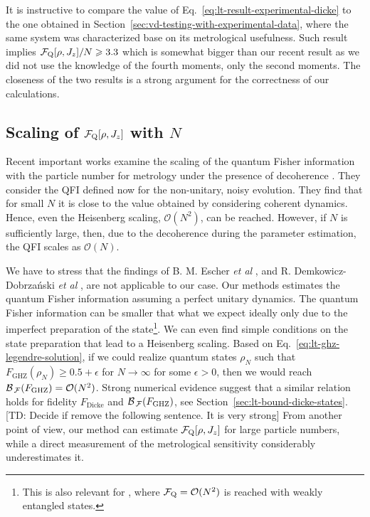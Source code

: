 It is instructive to compare the value of Eq.~\eqref{eq:lt-result-experimental-dicke} to the one obtained in Section~\ref{sec:vd-testing-with-experimental-data}, where the same system was characterized base on its metrological usefulness.
Such result implies $\mathcal{F}_{\textnormal{Q}}[{\textstyle \rho,J_z}]/N\geqslant3.3$ which is somewhat bigger than our recent result as we did not use the knowledge of the fourth moments, only the second moments.
The closeness of the two results is a strong argument for the correctness of our calculations.

\subsection{Scaling of $\mathcal{F}_{\textnormal{Q}}[{\textstyle \rho,J_z}]$ with $N$}

Recent important works examine the scaling of the quantum Fisher information with the particle number for metrology under the presence of decoherence \cite{Escher2011, Demkowicz-Dobrzanski2012}.
They consider the QFI defined now for the non-unitary, noisy evolution.
They find that for small $N$ it is close to the value obtained by considering coherent dynamics.
Hence, even the Heisenberg scaling, $\mathcal{O}(N^2)$, can be reached.
However, if $N$ is sufficiently large, then, due to the decoherence during the parameter estimation, the QFI scales as $\mathcal{O}(N)$.

We have to stress that the findings of B. M. Escher {\it et al} \cite{Rscher2011}, and R. Demkowicz-Dobrza{\'{n}}ski {\it et al} \cite{Demkowicz-Dobrzanski2012}, are not applicable to our case.
Our methods estimates the quantum Fisher information assuming a perfect unitary dynamics.
The quantum Fisher information can be smaller that what we expect ideally only due to the imperfect preparation of the state\footnote{
This is also relevant for \cite{Augusiak2015}, where $\mathcal{F}_{\textnormal{Q}}=\mathcal{O}(N^2)$ is reached with weakly entangled states.}.
We can even find simple conditions on the state preparation that lead to a Heisenberg scaling.
Based on Eq.~\eqref{eq:lt-ghz-legendre-solution}, if we could realize quantum states $\rho_N$ such that $F_{\text{GHZ}}(\rho_N)\geqslant0.5+\epsilon$ for $N\rightarrow\infty$ for some $\epsilon>0$, then we would reach $\mathcal{B}_{\, \mathcal{F} }(F_{\text{GHZ}}) = \mathcal{O}(N^2)$.
Strong numerical evidence suggest that a similar relation holds for fidelity $F_{\text{Dicke}}$ and $\mathcal{B}_{\, \mathcal{F} }(F_{\text{GHZ}})$, see Section~\ref{sec:lt-bound-dicke-states}.
[TD: Decide if remove the following sentence. It is very strong]
From another point of view, our method can estimate $\mathcal{F}_{\textnormal{Q}}[{\textstyle \rho,J_z}]$ for large particle numbers, while a direct measurement of the metrological sensitivity considerably underestimates it.
